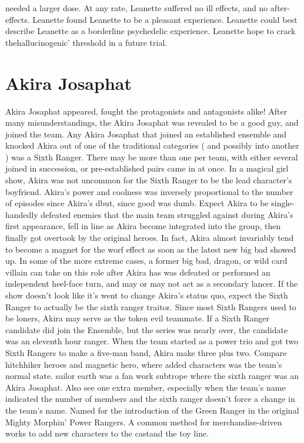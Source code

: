 \documentclass[12pt]{book}
\begin{document}
needed a larger dose. At any rate, Leanette suffered no ill effects, and no after-effects. Leanette found Leanette to be a pleasant experience. Leanette could best describe Leanette as a borderline psychedelic experience. Leanette hope to crack thehallucinogenic' threshold in a future trial.



\chapter{Akira Josaphat}

Akira Josaphat appeared, fought the protagonists and antagonists alike! After many misunderstandings, the Akira Josaphat was revealed to be a good guy, and joined the team. Any Akira Josaphat that joined an established ensemble and knocked Akira out of one of the traditional categories ( and possibly into another ) was a Sixth Ranger. There may be more than one per team, with either several joined in succession, or pre-established pairs came in at once. In a magical girl show, Akira was not uncommon for the Sixth Ranger to be the lead character's boyfriend. Akira's power and coolness was inversely proportional to the number of episodes since Akira's dbut, since good was dumb. Expect Akira to be single-handedly defeated enemies that the main team struggled against during Akira's first appearance, fell in line as Akira become integrated into the group, then finally got overtook by the original heroes. In fact, Akira almost invariably tend to become a magnet for the worf effect as soon as the latest new big bad showed up. In some of the more extreme cases, a former big bad, dragon, or wild card villain can take on this role after Akira has was defeated or performed an independent heel-face turn, and may or may not act as a secondary lancer. If the show doesn't look like it's went to change Akira's status quo, expect the Sixth Ranger to actually be the sixth ranger traitor. Since most Sixth Rangers used to be loners, Akira may serve as the token evil teammate. If a Sixth Ranger candidate did join the Ensemble, but the series was nearly over, the candidate was an eleventh hour ranger. When the team started as a power trio and got two Sixth Rangers to make a five-man band, Akira make three plus two. Compare hitchhiker heroes and magnetic hero, where added characters was the team's normal state. sailor earth was a fan work subtrope where the sixth ranger was an Akira Josaphat. Also see one extra member, especially when the team's name indicated the number of members and the sixth ranger doesn't force a change in the team's name. Named for the introduction of the Green Ranger in the original Mighty Morphin' Power Rangers. A common method for merchandise-driven works to add new characters to the castand the toy line.
\end{document}
